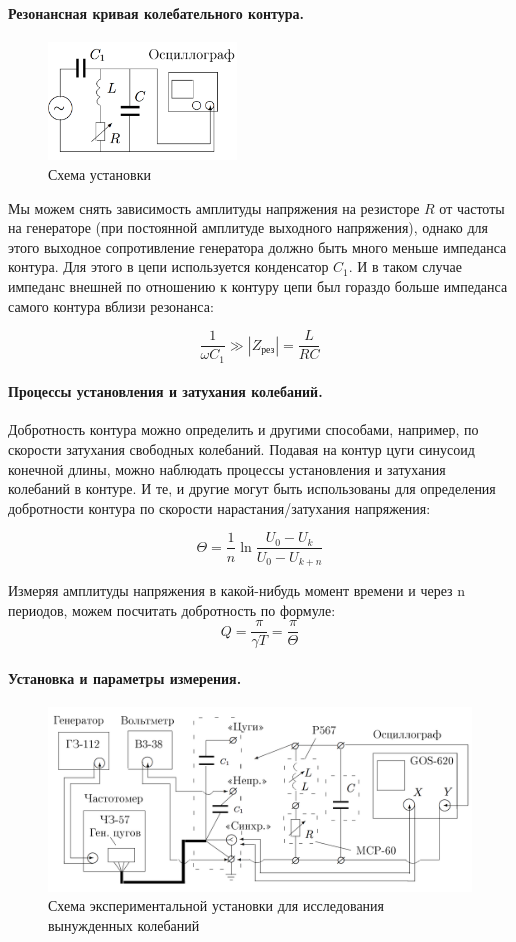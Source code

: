 \documentclass{../lab_class}
\begin{document}
\paragraph{Резонансная кривая колебательного контура.}
\begin{figure}
\centering
\includegraphics[width=5cm]{Fig2.png}
\caption{Схема установки}
\end{figure} 

Мы можем снять зависимость амплитуды напряжения на резисторе $R$ от частоты на генераторе (при постоянной амплитуде выходного напряжения), однако для этого выходное сопротивление генератора должно быть много меньше импеданса контура. Для этого в цепи используется конденсатор $C_1$. И в таком случае импеданс внешней по отношению к контуру цепи был гораздо больше импеданса самого контура вблизи резонанса:

$$\dfrac{1}{\omega C_1} \gg |Z_\text{рез}| = \dfrac{L}{RC} $$

\paragraph{Процессы установления и затухания колебаний.}
Добротность контура можно определить и другими способами, например, по скорости затухания свободных колебаний. Подавая на контур цуги синусоид конечной длины, можно наблюдать процессы установления и затухания колебаний в контуре. И те, и другие могут быть использованы для определения добротности контура по скорости нарастания/затухания напряжения:

$$\Theta = \dfrac{1}{n} \ln \dfrac{U_0 - U_k}{U_0-U_{k+n}} $$

Измеряя амплитуды напряжения в какой-нибудь момент времени и через n периодов, можем посчитать добротность по формуле:
$$Q = \dfrac{\pi}{\gamma 	T} = \dfrac{\pi}{\Theta}$$

\paragraph{Установка и параметры измерения.}
\begin{figure}[H]
\centering
\includegraphics[width = 0.9 \textwidth]{Fig.png}
\caption{Схема экспериментальной установки для исследования вынужденных колебаний}
\end{figure}
\end{document}
